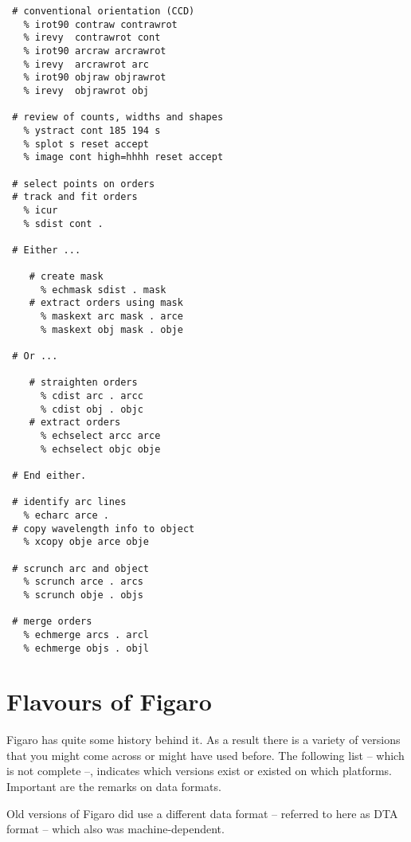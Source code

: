 \begin{verbatim}
 # conventional orientation (CCD)
   % irot90 contraw contrawrot
   % irevy  contrawrot cont
   % irot90 arcraw arcrawrot
   % irevy  arcrawrot arc
   % irot90 objraw objrawrot
   % irevy  objrawrot obj

 # review of counts, widths and shapes
   % ystract cont 185 194 s
   % splot s reset accept
   % image cont high=hhhh reset accept

 # select points on orders
 # track and fit orders
   % icur
   % sdist cont .

 # Either ...

    # create mask
      % echmask sdist . mask
    # extract orders using mask
      % maskext arc mask . arce
      % maskext obj mask . obje

 # Or ...

    # straighten orders
      % cdist arc . arcc
      % cdist obj . objc
    # extract orders
      % echselect arcc arce
      % echselect objc obje

 # End either.

 # identify arc lines
   % echarc arce .
 # copy wavelength info to object
   % xcopy obje arce obje

 # scrunch arc and object
   % scrunch arce . arcs
   % scrunch obje . objs

 # merge orders
   % echmerge arcs . arcl
   % echmerge objs . objl
\end{verbatim}


\section{Flavours of Figaro}
\label{flavours}

Figaro has quite some history behind it.  As a result there is a variety
of versions that you might come across or might have used before.  The
following list -- which is not complete --, indicates which versions exist
or existed on which platforms.  Important are the remarks on data
formats.

Old versions of Figaro did use a different data format -- referred to
here as DTA format -- which also was machine-dependent.

